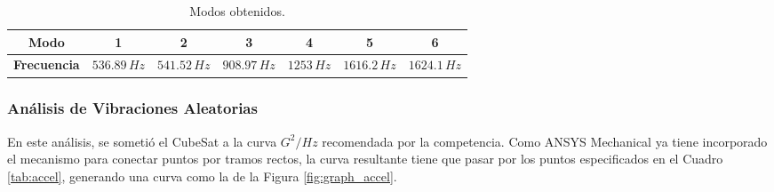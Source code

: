       \begin{table}[H]
      \centering
      \begin{tabular}{|c|c|c|c|c|c|c|}
      \hline
      \textbf{Modo}       & 1           & 2           & 3           & 4         & 5           & 6          \\
      \hline
      \textbf{Frecuencia} & $536.89\,Hz$ & $541.52\,Hz$ & $908.97\,Hz$ & $1253\,Hz$ & $1616.2\,Hz$ & $1624.1\,Hz$ \\
      \hline
      \end{tabular}
      \caption{Modos obtenidos.}
      \label{tab:modos_obtenidos}
      \end{table}

    \subsubsection{Análisis de Vibraciones Aleatorias}

      En este análisis, se sometió el CubeSat a la curva $G^2/Hz$ recomendada por la competencia. Como ANSYS Mechanical
      ya tiene incorporado el mecanismo para conectar puntos por tramos rectos, la curva resultante tiene que pasar por
      los puntos especificados en el Cuadro \ref{tab:accel}, generando una curva como la de la Figura
      \ref{fig:graph_accel}.


